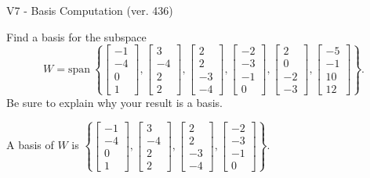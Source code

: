 \begin{exercise}
  \begin{exerciseTitle}V7 - Basis Computation (ver. 436)\end{exerciseTitle}
  \begin{exerciseStatement}
    Find a basis for the subspace 
\[W=\mathrm{span}\ \left\{\left[\begin{array}{r}
-1 \\
-4 \\
0 \\
1
\end{array}\right] , \left[\begin{array}{r}
3 \\
-4 \\
2 \\
2
\end{array}\right] , \left[\begin{array}{r}
2 \\
2 \\
-3 \\
-4
\end{array}\right] , \left[\begin{array}{r}
-2 \\
-3 \\
-1 \\
0
\end{array}\right] , \left[\begin{array}{r}
2 \\
0 \\
-2 \\
-3
\end{array}\right] , \left[\begin{array}{r}
-5 \\
-1 \\
10 \\
12
\end{array}\right]\right\}.\]
 Be sure to explain why your result is a basis.


  \end{exerciseStatement}
  \begin{exerciseAnswer}
   A basis of \(W\) is  \(\left\{\left[\begin{array}{r}
-1 \\
-4 \\
0 \\
1
\end{array}\right] , \left[\begin{array}{r}
3 \\
-4 \\
2 \\
2
\end{array}\right] , \left[\begin{array}{r}
2 \\
2 \\
-3 \\
-4
\end{array}\right] , \left[\begin{array}{r}
-2 \\
-3 \\
-1 \\
0
\end{array}\right]\right\}\).
  


  \end{exerciseAnswer}
\end{exercise}